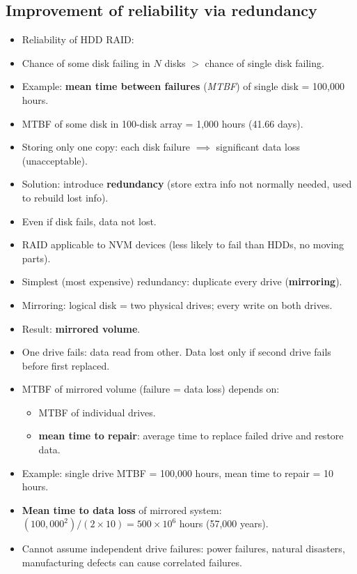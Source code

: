 \subsection{Improvement of reliability via redundancy}
\begin{itemize}
    \item Reliability of HDD RAID:
    \item Chance of some disk failing in $N$ disks $>$ chance of single disk failing.
    \item Example: \textbf{mean time between failures} (\textit{MTBF}) of single disk = 100,000 hours.
    \item MTBF of some disk in 100-disk array = 1,000 hours (41.66 days).
    \item Storing only one copy: each disk failure $\implies$ significant data loss (unacceptable).
    \item Solution: introduce \textbf{redundancy} (store extra info not normally needed, used to rebuild lost info).
    \item Even if disk fails, data not lost.
    \item RAID applicable to NVM devices (less likely to fail than HDDs, no moving parts).
    \item Simplest (most expensive) redundancy: duplicate every drive (\textbf{mirroring}).
    \item Mirroring: logical disk = two physical drives; every write on both drives.
    \item Result: \textbf{mirrored volume}.
    \item One drive fails: data read from other. Data lost only if second drive fails before first replaced.
    \item MTBF of mirrored volume (failure = data loss) depends on:
    \begin{itemize}
        \item MTBF of individual drives.
        \item \textbf{mean time to repair}: average time to replace failed drive and restore data.
    \end{itemize}
    \item Example: single drive MTBF = 100,000 hours, mean time to repair = 10 hours.
    \item \textbf{Mean time to data loss} of mirrored system: $(100,000^2) / (2 \times 10) = 500 \times 10^6$ hours (57,000 years).
    \item Cannot assume independent drive failures: power failures, natural disasters, manufacturing defects can cause correlated failures.

\end{itemize}
